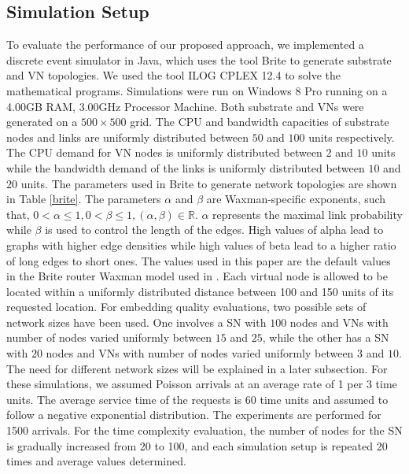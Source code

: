 \documentclass[journal]{IEEEtran}
\begin{document}
\subsection{Simulation Setup}
To evaluate the performance of our proposed approach, we implemented a discrete event simulator in Java, which uses the tool Brite \cite{Medina01} to generate substrate and \ac{VN} topologies. We used the tool ILOG CPLEX 12.4 \cite{CPLEX12.4} to solve the mathematical programs. Simulations were run on Windows $8$ Pro running on a 4.00GB RAM, 3.00GHz Processor Machine. Both substrate and \acp{VN} were generated on a $500\times500$ grid. The CPU and bandwidth capacities of substrate nodes and links are uniformly distributed between $50$ and $100$ units respectively. The CPU demand for \ac{VN} nodes is uniformly distributed between $2$ and $10$ units while the bandwidth demand of the links is uniformly distributed between $10$ and $20$ units. The parameters used in Brite to generate network topologies are shown in Table \ref{brite}. The parameters $\alpha$ and $\beta$ are Waxman-specific exponents, such that, $0 < \alpha \leq 1, 0 < \beta \leq 1, (\alpha, \beta) \in \mathbb{R}$. $\alpha$ represents the maximal link probability while $\beta$ is used to control the length of the edges. High values of alpha lead to graphs with higher edge densities while high values of beta lead to a higher ratio of long edges to short ones. The values used in this paper are the default values in the Brite router Waxman model used in \cite{Medina01}. Each virtual node is allowed to be located within a uniformly distributed distance between 100 and 150 units of its requested location. For embedding quality evaluations, two possible sets of network sizes have been used. One involves a \ac{SN} with $100$ nodes and \acp{VN} with number of nodes varied uniformly between $15$ and $25$, while the other has a \ac{SN} with $20$ nodes and \acp{VN} with number of nodes varied uniformly between $3$ and $10$. The need for different network sizes will be explained in a later subsection. For these simulations, we assumed Poisson arrivals at an average rate of 1 per 3 time units. The average service time of the requests is 60 time units and assumed to follow a negative exponential distribution. The experiments are performed for 1500 arrivals. For the time complexity evaluation, the number of nodes for the \ac{SN} is gradually increased from 20 to 100, and each simulation setup is repeated 20 times and average values determined. 
\end{document}
